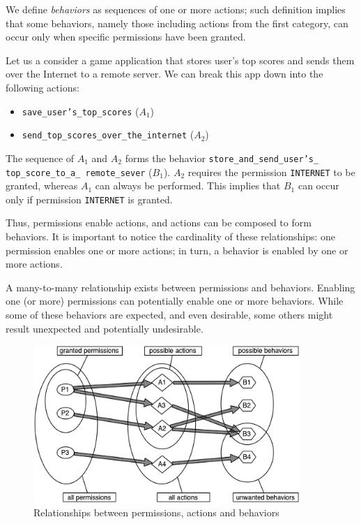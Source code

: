 We define \emph{behaviors} as sequences of one or more actions; such definition implies that some behaviors, namely those including actions from the first category, can occur only when specific permissions have been granted.


\begin{example}
\leavevmode
Let us a consider a game application that stores user's top scores and sends them over the Internet to a remote server.
We can break this app down into the following actions:
\begin{itemize}
  \item \texttt{save\_user's\_top\_scores} ($A_1$)
  \item \texttt{send\_top\_scores\_over\_the\_internet} ($A_2$)
\end{itemize} 
The sequence of $A_1$ and $A_2$ forms the behavior \texttt{store\_and\_send\_user's\_ top\_score\_to\_a\_ remote\_sever} ($B_1$).
$A_2$ requires the permission \linebreak \texttt{INTERNET} to be granted, whereas $A_1$ can always be performed.
This implies that $B_1$ can occur only if permission \texttt{INTERNET} is granted.
\end{example}

Thus, permissions enable actions, and actions can be composed to form behaviors. It is important to notice the cardinality of these relationships: one permission enables one or more actions; in turn, a behavior is enabled by one or more actions.

A many-to-many relationship exists between permissions and behaviors. Enabling one (or more) permissions can potentially enable one or more behaviors.
While some of these behaviors are expected, and even desirable, some others might result unexpected and potentially undesirable. 

\begin{figure}[tb]
\centering
     \includegraphics[width=0.9\textwidth]{images/context}
      \caption{Relationships between permissions, actions and behaviors}
      \label{fig:privacy-context}
\end{figure}

